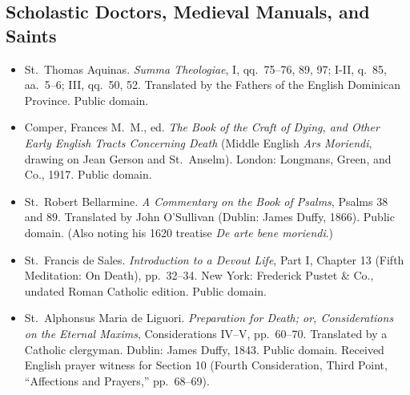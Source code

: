 \subsection*{Scholastic Doctors, Medieval Manuals, and Saints}

\begin{itemize}
\item St.\ Thomas Aquinas. \textit{Summa Theologiae}, I, qq.\ 75--76, 89, 97; I-II, q.\ 85, aa.\ 5--6; III, qq.\ 50, 52. Translated by the Fathers of the English Dominican Province. Public domain.
\item Comper, Frances M.\ M., ed. \textit{The Book of the Craft of Dying, and Other Early English Tracts Concerning Death} (Middle English \textit{Ars Moriendi}, drawing on Jean Gerson and St.\ Anselm). London: Longmans, Green, and Co., 1917. Public domain.
\item St.\ Robert Bellarmine. \textit{A Commentary on the Book of Psalms}, Psalms 38 and 89. Translated by John O'Sullivan (Dublin: James Duffy, 1866). Public domain. (Also noting his 1620 treatise \textit{De arte bene moriendi}.)
\item St.\ Francis de Sales. \textit{Introduction to a Devout Life}, Part I, Chapter 13 (Fifth Meditation: On Death), pp.\ 32--34. New York: Frederick Pustet \& Co., undated Roman Catholic edition. Public domain.
\item St.\ Alphonsus Maria de Liguori. \textit{Preparation for Death; or, Considerations on the Eternal Maxims}, Considerations IV--V, pp.\ 60--70. Translated by a Catholic clergyman. Dublin: James Duffy, 1843. Public domain. Received English prayer witness for Section 10 (Fourth Consideration, Third Point, ``Affections and Prayers,'' pp.\ 68--69).
\end{itemize}
\endgroup
